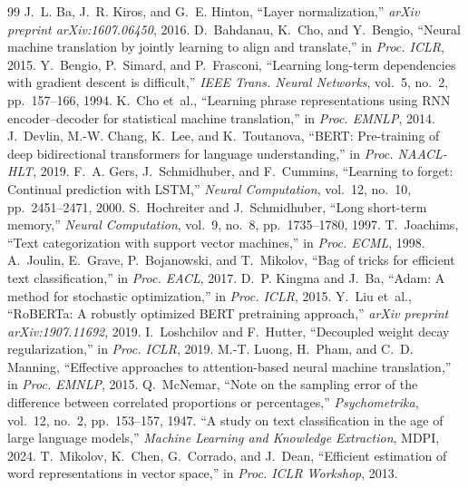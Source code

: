 \begin{thebibliography}{99}
 J.~L. Ba, J.~R. Kiros, and G.~E. Hinton, ``Layer normalization,'' \textit{arXiv preprint arXiv:1607.06450}, 2016.
 D.~Bahdanau, K.~Cho, and Y.~Bengio, ``Neural machine translation by jointly learning to align and translate,'' in \textit{Proc. ICLR}, 2015.
 Y.~Bengio, P.~Simard, and P.~Frasconi, ``Learning long-term dependencies with gradient descent is difficult,'' \textit{IEEE Trans. Neural Networks}, vol.~5, no.~2, pp.~157--166, 1994.
 K.~Cho et~al., ``Learning phrase representations using RNN encoder--decoder for statistical machine translation,'' in \textit{Proc. EMNLP}, 2014.
 J.~Devlin, M.-W. Chang, K.~Lee, and K.~Toutanova, ``BERT: Pre-training of deep bidirectional transformers for language understanding,'' in \textit{Proc. NAACL-HLT}, 2019.
 F.~A. Gers, J.~Schmidhuber, and F.~Cummins, ``Learning to forget: Continual prediction with LSTM,'' \textit{Neural Computation}, vol.~12, no.~10, pp.~2451--2471, 2000.
 S.~Hochreiter and J.~Schmidhuber, ``Long short-term memory,'' \textit{Neural Computation}, vol.~9, no.~8, pp.~1735--1780, 1997.
 T.~Joachims, ``Text categorization with support vector machines,'' in \textit{Proc. ECML}, 1998.
 A.~Joulin, E.~Grave, P.~Bojanowski, and T.~Mikolov, ``Bag of tricks for efficient text classification,'' in \textit{Proc. EACL}, 2017.
 D.~P. Kingma and J.~Ba, ``Adam: A method for stochastic optimization,'' in \textit{Proc. ICLR}, 2015.
 Y.~Liu et~al., ``RoBERTa: A robustly optimized BERT pretraining approach,'' \textit{arXiv preprint arXiv:1907.11692}, 2019.
 I.~Loshchilov and F.~Hutter, ``Decoupled weight decay regularization,'' in \textit{Proc. ICLR}, 2019.
 M.-T. Luong, H.~Pham, and C.~D. Manning, ``Effective approaches to attention-based neural machine translation,'' in \textit{Proc. EMNLP}, 2015.
 Q.~McNemar, ``Note on the sampling error of the difference between correlated proportions or percentages,'' \textit{Psychometrika}, vol.~12, no.~2, pp.~153--157, 1947.
 ``A study on text classification in the age of large language models,'' \textit{Machine Learning and Knowledge Extraction}, MDPI, 2024.
 T.~Mikolov, K.~Chen, G.~Corrado, and J.~Dean, ``Efficient estimation of word representations in vector space,'' in \textit{Proc. ICLR Workshop}, 2013.

\end{thebibliography}
